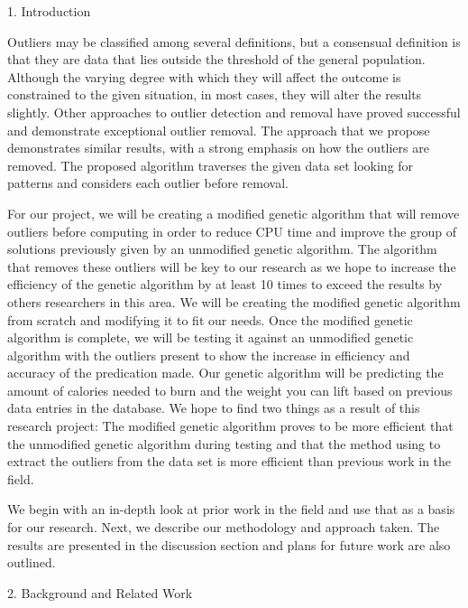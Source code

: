 \documentclass[conference]{IEEEtran}
\begin{document}
\large 1. Introduction

Outliers may be classified among several definitions, but a consensual definition is that they are data that lies outside the threshold of the general population. Although the varying degree with which they will affect the outcome is constrained to the given situation, in most cases, they will alter the results slightly. Other approaches to outlier detection and removal have proved successful and demonstrate exceptional outlier removal. The approach that we propose demonstrates similar results, with a strong emphasis on how the outliers are removed. The proposed algorithm traverses the given data set looking for patterns and considers each outlier before removal.

For our project, we will be creating a modified genetic algorithm that will remove outliers before computing in order to reduce CPU time and improve the group of solutions previously given by an unmodified genetic algorithm. The algorithm that removes these outliers will be key to our research as we hope to increase the efficiency of the genetic algorithm by at least 10 times to exceed the results by others researchers in this area. We will be creating the modified genetic algorithm from scratch and modifying it to fit our needs. Once the modified genetic algorithm is complete, we will be testing it against an unmodified genetic algorithm with the outliers present to show the increase in efficiency and accuracy of the predication made. Our genetic algorithm will be predicting the amount of calories needed to burn and the weight you can lift based on previous data entries in the database. We hope to find two things as a result of this research project: The modified genetic algorithm proves to be more efficient that the unmodified genetic algorithm during testing and that the method using to extract the outliers from the data set is more efficient than previous work in the field. 

We begin with an in-depth look at prior work in the field and use that as a basis for our research. Next, we describe our methodology and approach taken. The results are presented in the discussion section and plans for future work are also outlined. 



\large 2. Background and Related Work
\end{document}
